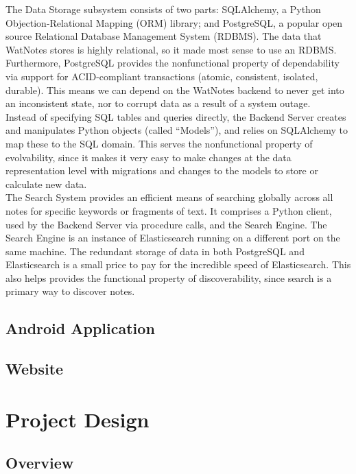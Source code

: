\documentclass[12pt]{article}
\begin{document}
    The Data Storage subsystem consists of two parts: SQLAlchemy, a Python
    Objection-Relational Mapping (ORM) library; and PostgreSQL, a popular open
    source Relational Database Management System (RDBMS). The data that WatNotes
    stores is highly relational, so it made most sense to use an RDBMS.
    Furthermore, PostgreSQL provides the nonfunctional property of dependability
    via support for ACID-compliant transactions (atomic, consistent, isolated,
    durable). This means we can depend on the WatNotes backend to never get into
    an inconsistent state, nor to corrupt data as a result of a system outage.\\

    Instead of specifying SQL tables and queries directly, the Backend Server
    creates and manipulates Python objects (called ``Models''), and relies on
    SQLAlchemy to map these to the SQL domain. This serves the nonfunctional
    property of evolvability, since it makes it very easy to make changes at the
    data representation level with migrations and changes to the models to store
    or calculate new data.\\

    The Search System provides an efficient means of searching globally across
    all notes for specific keywords or fragments of text. It comprises a Python
    client, used by the Backend Server via procedure calls, and the Search
    Engine. The Search Engine is an instance of Elasticsearch running on a
    different port on the same machine. The redundant storage of data in both
    PostgreSQL and Elasticsearch is a small price to pay for the incredible
    speed of Elasticsearch. This also helps provides the functional property of
    discoverability, since search is a primary way to discover notes.

  \subsection{Android Application}
  \subsection{Website}

  \newpage

  \section{Project Design}
  \subsection{Overview}
\end{document}
